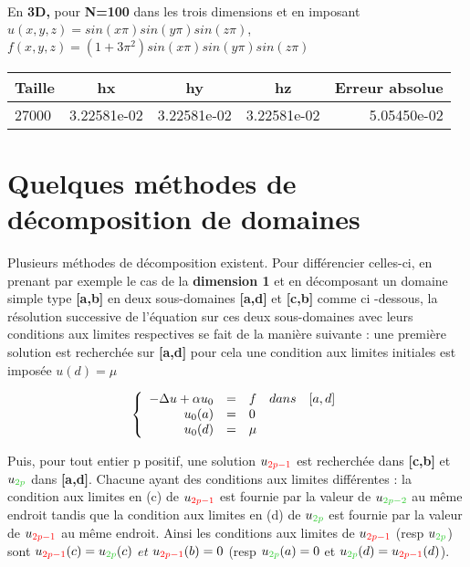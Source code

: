 \documentclass[a4paper,12pt,twoside]{report}
\begin{document}
\

En \textbf{\color[rgb]{0,0.13,0.75}
3D,} pour \textbf{N=100} dans les trois dimensions et en imposant $u(x,y,z)=sin(x{\pi})sin(y{\pi})sin(z{\pi})$,  $ f(x,y,z)=(1+3{\pi}^2)sin(x{\pi})sin(y{\pi})sin(z{\pi})$

\begin{tabular}{|l|c|c|c|r|}
  \hline
  Taille & hx  & hy  & hz & Erreur absolue \\
  \hline
  27000 & 3.22581e-02   & 3.22581e-02& 3.22581e-02&5.05450e-02  \\
  \hline
\end{tabular}

\cleardoublepage

\chapter{Quelques méthodes de décomposition de domaines}


Plusieurs méthodes de décomposition existent. Pour différencier celles-ci, en prenant par exemple le cas de la \textbf{dimension 1} et en décomposant un domaine simple type \textbf{[a,b]} en deux sous-domaines 
\textbf{\color[rgb]{0,0.58,0}
[a,d]} et \textbf{\color[rgb]{1,0,0}
[c,b]} comme ci -dessous, la résolution successive de l'équation sur ces deux sous-domaines  avec leurs conditions aux limites respectives se fait de la manière suivante :
une première solution est recherchée sur \textbf{[a,d] }pour cela une condition aux limites initiales est imposée $ u(d)=\mu
  $


\[
\left\{
\begin{array}{r c l}
 -\Delta u + \alpha u_{0} &=&f \quad  dans\quad [a,d] \\
 u_{0}(a)&=&0\\
u_{0}(d)&=&\mu
\end{array}
\right.
\]



Puis, pour tout entier p positif, une solution $u_{\color[rgb]{1,0,0}2p-1} $ est recherchée dans \textbf{[c,b]} et $u_{\color[rgb]{0.2,0.8,0.2}
2p}$ dans \textbf{[a,d]}. Chacune ayant des conditions aux limites différentes :  la condition aux limites en (c) de $u_{\color[rgb]{1,0,0}2p-1}$ est fournie par la valeur de $u_{\color[rgb]{0.2,0.8,0.2}
2p-2}$ au même endroit tandis que la condition aux limites en (d) de $u_{\color[rgb]{0.2,0.8,0.2}
2p}$ est fournie par la valeur de $u_{\color[rgb]{1,0,0}2p-1}$ au même endroit. Ainsi les conditions aux limites de $u_{\color[rgb]{1,0,0}2p-1}$ (resp $u_{\color[rgb]{0.2,0.8,0.2}
2p}$) sont $u_{\color[rgb]{1,0,0}2p-1}(c)= u_{\color[rgb]{0.2,0.8,0.2}
2p}(c) $
$et   $ $ u_{\color[rgb]{1,0,0}2p-1}(b)=0$ (resp $u_{\color[rgb]{0.2,0.8,0.2}
2p}(a)=0$ et $u_{\color[rgb]{0.2,0.8,0.2}
2p}(d)= u_{\color[rgb]{1,0,0}2p-1}(d)$).
\end{document}
